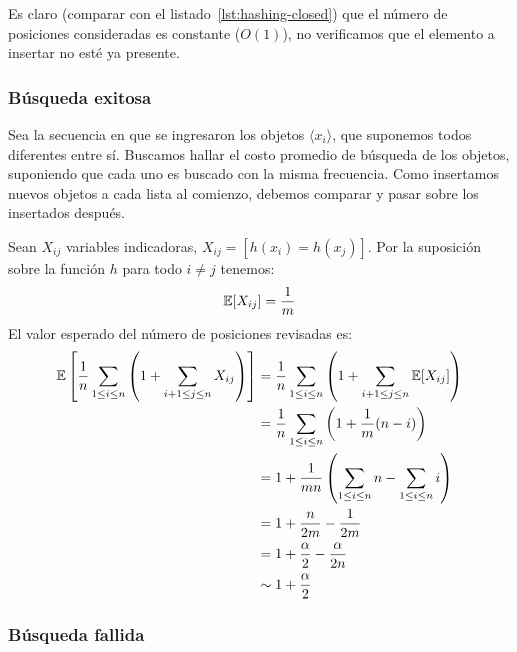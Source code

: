   Es claro
  (comparar con el listado~\ref{lst:hashing-closed})
  que el número de posiciones consideradas es constante
  (\(O(1)\)),
  no verificamos que el elemento a insertar no esté ya presente.

\subsubsection{Búsqueda exitosa}
\label{sec:hashing-cerrado-busqueda-exitosa}

  Sea la secuencia en que se ingresaron los objetos
  \(\langle x_i \rangle\),
  que suponemos todos diferentes entre sí.
  Buscamos hallar el costo promedio de búsqueda de los objetos,
  suponiendo que cada uno es buscado con la misma frecuencia.
  Como insertamos nuevos objetos a cada lista al comienzo,
  debemos comparar y pasar sobre los insertados después.

  Sean \(X_{i j}\) variables indicadoras,
  \(X_{i j} = [h(x_i) = h(x_j)]\).
  Por la suposición sobre la función \(h\)
  para todo \(i \ne j\) tenemos:
  \begin{equation*}
    \operatorname{\mathbb{E}}[X_{i j}]
      = \frac{1}{m}
  \end{equation*}
  El valor esperado del número de posiciones revisadas
  es:
  \begin{align}
    \operatorname{\mathbb{E}}\left[
          \frac{1}{n} \sum_{1 \le i \le n}
                        \left(
                          1 + \sum_{i + 1 \le j \le n} X_{i j}
                        \right)
          \right]
      &=	   \frac{1}{n} \sum_{1 \le i \le n}
                          \left(
                            1 + \sum_{i + 1 \le j \le n} \operatorname{\mathbb{E}}[X_{i j}]
                          \right) \notag \\
      &=	   \frac{1}{n} \sum_{1 \le i \le n}
                          \left(
                            1 + \frac{1}{m} (n - i)
                          \right) \notag \\
      &=	   1 + \frac{1}{m n}
                  \left(
                    \sum_{1 \le i \le n} n - \sum_{1 \le i \le n} i
                  \right) \notag \\
      &=	   1 + \frac{n}{2 m} - \frac{1}{2 m} \\
      &=	   1 + \frac{\alpha}{2} - \frac{\alpha}{2 n} \notag \\
      &\sim 1 + \frac{\alpha}{2}
         \label{eq:hashing-closed-success}
  \end{align}

\subsubsection{Búsqueda fallida}
\label{sec:hashing-cerrado-busqueda-fallida}

